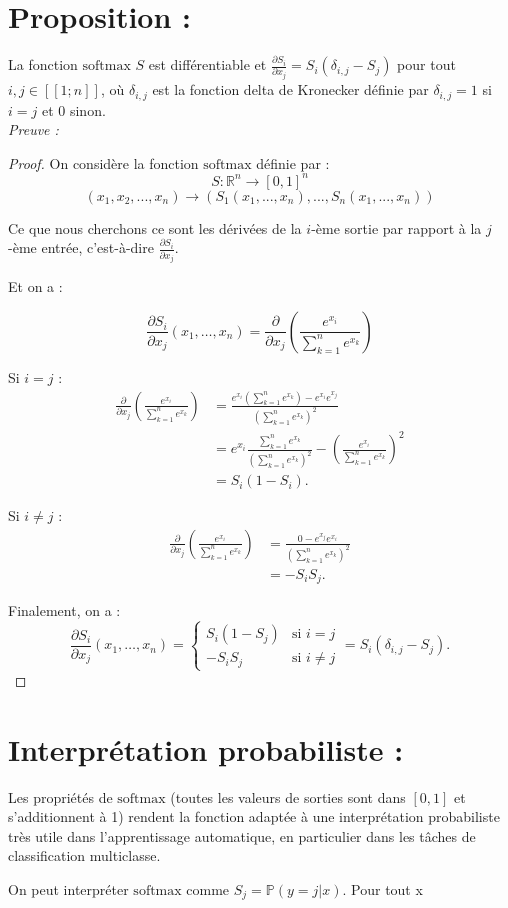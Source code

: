 \documentclass{article}
\begin{document}
\section*{Proposition :}

La fonction $\text{softmax}$ $S$ est différentiable et $\frac{\partial S_i}{\partial x_j} = S_i(\delta_{i,j} - S_j)$ pour tout $i, j \in [\![1; n]\!]$, où $\delta_{i,j}$ est la fonction delta de Kronecker définie par $\delta_{i,j} = 1$ si $i = j$ et $0$ sinon. \\

\textit{Preuve :} 

\begin{proof}
On considère la fonction $\text{softmax}$ définie par :
\[S : \mathbb{R}^n \rightarrow [0,1]^n\]
\[(x_1,x_2,...,x_n) \rightarrow (S_1(x_1,...,x_n),...,S_n(x_1,...,x_n))\]

Ce que nous cherchons ce sont les dérivées de la $i$-ème sortie par rapport à la $j$-ème entrée, c'est-à-dire $\frac{\partial S_i}{\partial x_j}$.

Et on a :

\[
\frac{\partial S_i}{\partial x_j}(x_1, \ldots, x_n) = \frac{\partial}{\partial x_j}\left(\frac{e^{x_i}}{\sum_{k=1}^{n} e^{x_k}}\right)
\]

Si $i=j$ :
\[
\begin{aligned}
    \frac{\partial}{\partial x_j}\left(\frac{e^{x_i}}{\sum_{k=1}^{n} e^{x_k}}\right) &= \frac{e^{x_i}(\sum_{k=1}^{n}e^{x_k}) -e^{x_i}e^{x_j}}{(\sum_{k=1}^{n} e^{x_k})^2} \\
    &= e^{x_i}\frac{\sum_{k=1}^{n}e^{x_k}}{(\sum_{k=1}^{n}e^{x_k})^2} - \left(\frac{e^{x_i}}{\sum_{k=1}^{n}e^{x_k}}\right)^2 \\
    &= S_i(1 - S_i).
\end{aligned}
\]

Si $i \neq j$ :
\[
\begin{aligned}
    \frac{\partial}{\partial x_j}\left(\frac{e^{x_i}}{\sum_{k=1}^{n} e^{x_k}}\right) &= \frac{0 - e^{x_j}e^{x_i}}{(\sum_{k=1}^{n}e^{x_k})^2} \\
    &= -S_iS_j.
\end{aligned}
\]

Finalement, on a :
\[
\frac{\partial S_i}{\partial x_j} (x_1, \ldots, x_n) =
\begin{cases}
    S_i(1-S_j) & \text{si } i = j \\
    -S_iS_j & \text{si } i \neq j
\end{cases} = S_i(\delta_{i,j} - S_j).
\]
\end{proof}


\section*{Interprétation probabiliste :}

Les propriétés de $\text{softmax}$ (toutes les valeurs de sorties sont dans $[0,1]$ et s'additionnent à 1) rendent la fonction adaptée à une interprétation probabiliste très utile dans l'apprentissage automatique, en particulier dans les tâches de classification multiclasse.

On peut interpréter $\text{softmax}$ comme $S_j = \mathbb{P}(y=j|x)$.
Pour tout x 
\end{document}
